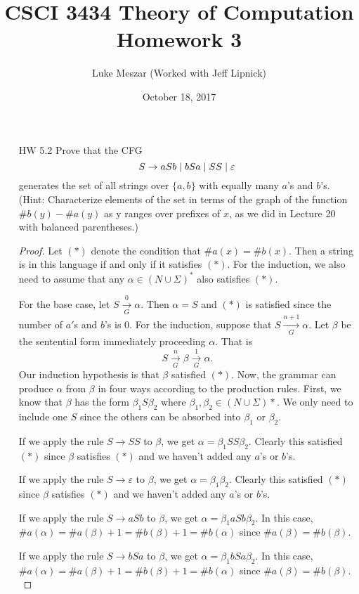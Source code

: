 \documentclass{article}
\title{CSCI 3434 Theory of Computation Homework 3}
\author{Luke Meszar (Worked with Jeff Lipnick)}
\date{October 18, 2017}
\newcommand{\ifff}{if and only if }
\newcommand{\setst}{\hspace{1mm} | \hspace{1mm} }
\renewcommand{\epsilon}{\varepsilon}
\theoremstyle{definition}
\begin{document}
\maketitle
\begin{enumerate}
	\item[HW 5.2]
	Prove that the CFG 
	\[S \rightarrow aSb \setst bSa \setst SS \setst \epsilon\]
	generates the set of all strings over $\{a,b\}$ with equally many $a$'s and $b$'s. (Hint: Characterize elements of the set in terms of the graph of
	the function $\#b(y)-\#a(y)$ as y ranges over prefixes of $x$, as we did
	in Lecture 20 with balanced parentheses.)
	\begin{proof}
		Let $(*)$ denote the condition that $\#a(x) = \#b(x)$. Then a string is in this language \ifff it satisfies $(*)$. For the induction, we also need to assume that any $\alpha \in (N \cup \Sigma)^*$ also satisfies $(*)$. 
		
		For the base case, let $S \xrightarrow[G]{0} \alpha$. Then $\alpha = S$ and $(*)$ is satisfied since the number of $a'$s and $b$'s is 0. For the induction, suppose that $S \xrightarrow[G]{n+1} \alpha$. Let $\beta$ be the sentential form immediately proceeding $\alpha$. That is
		\[S \xrightarrow[G]{n} \beta \xrightarrow[G]{1} \alpha.\]
		Our induction hypothesis is that $\beta$ satisfied $(*)$. Now, the grammar can produce $\alpha$ from $\beta$ in four ways according to the production rules. First, we know that $\beta$ has the form $\beta_1S\beta_2$ where $\beta_1,\beta_2 \in (N \cup \Sigma)*$. We only need to include one $S$ since the others can be absorbed into $\beta_1$ or $\beta_2$. 
		
		If we apply the rule $S \to SS$ to $\beta$, we get $\alpha = \beta_1SS\beta_2$. Clearly this satisfied $(*)$ since $\beta$ satisfies $(*)$ and we haven't added any $a$'s or $b$'s. 
		
		If we apply the rule $S \to \epsilon$ to $\beta$, we get $\alpha = \beta_1\beta_2$. Clearly this satisfied $(*)$ since $\beta$ satisfies $(*)$ and we haven't added any $a$'s or $b$'s. 
		
		If we apply the rule $S \to aSb$ to $\beta$, we get $\alpha = \beta_1aSb\beta_2$. In this case, $\#a(\alpha) = \#a(\beta) + 1 = \#b(\beta) + 1 = \#b(\alpha)$ since $\#a(\beta) = \#b(\beta).$
		
		If we apply the rule $S \to bSa$ to $\beta$, we get $\alpha = \beta_1bSa\beta_2$. In this case, $\#a(\alpha) = \#a(\beta) + 1 = \#b(\beta) + 1 = \#b(\alpha)$ since $\#a(\beta) = \#b(\beta).$
		

\end{proof}
\end{enumerate}
\end{document}
